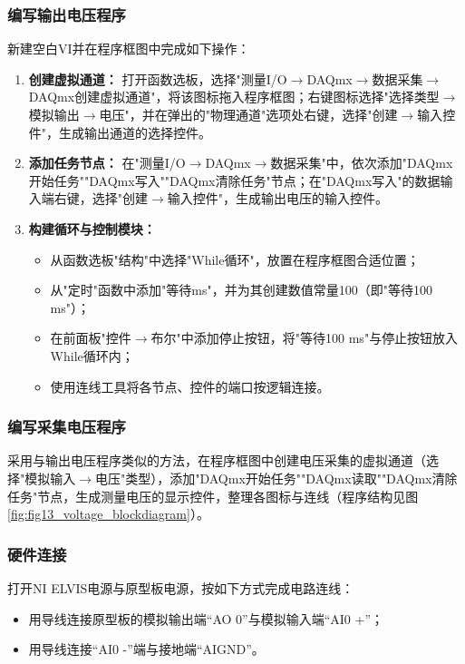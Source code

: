 \documentclass[11pt]{article}
\begin{document}
\subsubsection{编写输出电压程序}
新建空白VI并在程序框图中完成如下操作：
\begin{enumerate}
    \item \textbf{创建虚拟通道：} 打开函数选板，选择"测量I/O$\rightarrow$DAQmx$\rightarrow$数据采集$\rightarrow$DAQmx创建虚拟通道"，将该图标拖入程序框图；右键图标选择"选择类型$\rightarrow$模拟输出$\rightarrow$电压"，并在弹出的"物理通道"选项处右键，选择"创建$\rightarrow$输入控件"，生成输出通道的选择控件。
    \item \textbf{添加任务节点：} 在"测量I/O$\rightarrow$DAQmx$\rightarrow$数据采集"中，依次添加"DAQmx开始任务""DAQmx写入""DAQmx清除任务"节点；在"DAQmx写入"的数据输入端右键，选择"创建$\rightarrow$输入控件"，生成输出电压的输入控件。
    \item \textbf{构建循环与控制模块：}
          \begin{itemize}
              \item 从函数选板"结构"中选择"While循环"，放置在程序框图合适位置；
              \item 从"定时"函数中添加"等待ms"，并为其创建数值常量100（即"等待100 ms"）；
              \item 在前面板"控件$\rightarrow$布尔"中添加停止按钮，将"等待100 ms"与停止按钮放入While循环内；
              \item 使用连线工具将各节点、控件的端口按逻辑连接。
          \end{itemize}
\end{enumerate}


\subsubsection{编写采集电压程序}
采用与输出电压程序类似的方法，在程序框图中创建电压采集的虚拟通道（选择"模拟输入$\rightarrow$电压"类型），添加"DAQmx开始任务""DAQmx读取""DAQmx清除任务"节点，生成测量电压的显示控件，整理各图标与连线（程序结构见图\ref{fig:fig13_voltage_blockdiagram}）。

\subsubsection{硬件连接}
打开NI ELVIS电源与原型板电源，按如下方式完成电路连线：
\begin{itemize}
    \item 用导线连接原型板的模拟输出端“AO 0”与模拟输入端“AI0 +”；
    \item 用导线连接“AI0 -”端与接地端“AIGND”。
\end{itemize}
\end{document}
